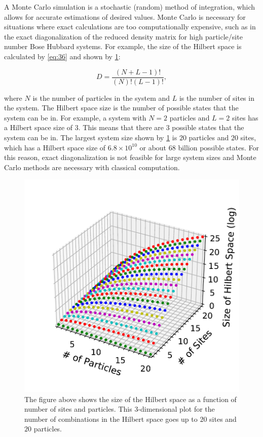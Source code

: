 A Monte Carlo simulation is a stochastic (random) method of integration, which allows for accurate estimations of desired values. Monte Carlo is necessary for situations where exact calculations are too computationally expensive, such as in the exact diagonalization of the reduced density matrix for high particle/site number Bose Hubbard systems. For example, the size of the Hilbert space is calculated by \cref{eq:36} and shown by \cref{fig:hilbert_space_size}:

\begin{equation}
D = \frac{\left(N+L-1\right)!}{\left(N\right)!\left(L-1\right)!},
\label{eq:36}
\end{equation}

\noindent where $N$ is the number of particles in the system and $L$ is the number of sites in the system. The Hilbert space size is the number of possible states that the system can be in. For example, a system with $N=2$ particles and $L=2$ sites has a Hilbert space size of $3$. This means that there are $3$ possible states that the system can be in. The largest system size shown by \cref{fig:hilbert_space_size} is $20$ particles and $20$ sites, which has a Hilbert space size of $6.8 \times 10^{10}$ or about 68 billion possible states. For this reason, exact diagonalization is not feasible for large system sizes and Monte Carlo methods are necessary with classical computation.

\begin{figure}[H]
\centering
\includegraphics[scale=0.5]{../figures/hilbert_space_size.pdf}
\caption{The figure above shows the size of the Hilbert space as a function of number of sites and particles. This 3-dimensional plot for the number of combinations in the Hilbert space goes up to $20$ sites and $20$ particles.}
\label{fig:hilbert_space_size}
\end{figure}

